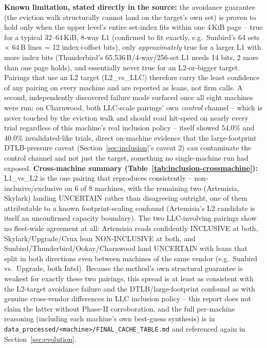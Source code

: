 \documentclass{article}
\begin{document}
\textbf{Known limitation, stated directly in the source:} the avoidance guarantee (the
eviction walk structurally cannot land on the target's own set) is proven to hold only when
the upper level's entire set-index fits within one 4\,KiB page -- true for a typical
32--64\,KiB, 8-way L1 (confirmed to fit exactly, e.g.\ Sunbird's 64 sets $\times$ 64\,B
lines = 12 index+offset bits), only \emph{approximately} true for a larger L1 with more
index bits (Thunderbird's 65{,}536\,B/4-way/256-set L1 needs 14 bits, 2 more than one page
holds), and essentially never true for an L2-or-bigger target. Pairings that use an L2
target (L2\_vs\_LLC) therefore carry the least confidence of any pairing on every machine
and are reported as leans, not firm calls. A second, independently discovered failure mode
surfaced once all eight machines were run: on Charnwood, both LLC-scale pairings' own
\emph{control} channel -- which is never touched by the eviction walk and should read
hit-speed on nearly every trial regardless of this machine's real inclusion policy --
itself showed 54.0\% and 40.0\% invalidated-like trials, direct on-machine evidence that
the large-footprint DTLB-pressure caveat (Section~\ref{sec:inclusion}'s caveat 2) can
contaminate the control channel and not just the target, something no single-machine run
had exposed. \textbf{Cross-machine summary (Table~\ref{tab:inclusion-crossmachine}):}
L1\_vs\_L2 is the one pairing that reproduces consistently -- non-inclusive/exclusive on
6 of 8 machines, with the remaining two (Artemisia, Skylark) landing UNCERTAIN rather than
disagreeing outright, one of them attributable to a known footprint-scaling confound
(Artemisia's L2 candidate is itself an unconfirmed capacity boundary). The two
LLC-involving pairings show no fleet-wide agreement at all: Artemisia reads confidently
INCLUSIVE at both, Skylark/Upgrade/Crux lean NON-INCLUSIVE at both, and
Sunbird/Thunderbird/Ookay/Charnwood land UNCERTAIN with leans that split in both
directions even between machines of the same vendor (e.g.\ Sunbird vs.\ Upgrade, both
Intel). Because the method's own structural guarantee is weakest for exactly these two
pairings, this spread is at least as consistent with the L2-target avoidance failure and
the DTLB/large-footprint confound as with genuine cross-vendor differences in LLC
inclusion policy -- this report does not claim the latter without Phase-II corroboration,
and the full per-machine reasoning (including each machine's own best-guess synthesis) is
in \texttt{data\_processed/<machine>/FINAL\_CACHE\_TABLE.md} and referenced again in
Section~\ref{sec:evolution}.
\end{document}
